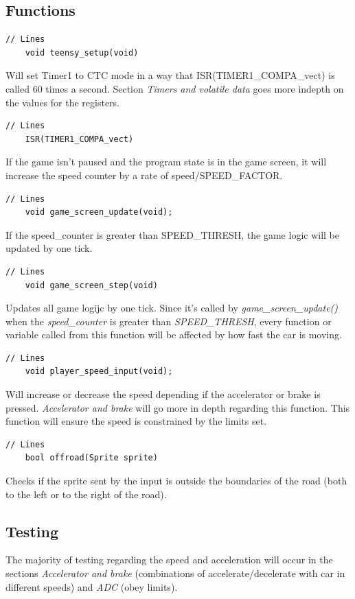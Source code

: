 \documentclass{article}
\begin{document}
\subsection*{Functions}
\begin{lstlisting}[style=CStyle]
	// Lines
	void teensy_setup(void)
\end{lstlisting}
Will set Timer1 to CTC mode in a way that ISR(TIMER1\_COMPA\_vect) is called 60 times a second. Section \emph{Timers and volatile data} goes more indepth on the values for the registers. 
\begin{lstlisting}[style=CStyle]
	// Lines
	ISR(TIMER1_COMPA_vect)
\end{lstlisting}
If the game isn't paused and the program state is in the game screen, it will increase the speed counter by a rate of speed/SPEED\_FACTOR.
\begin{lstlisting}[style=CStyle]
	// Lines
	void game_screen_update(void);
\end{lstlisting}
If the speed\_counter is greater than SPEED\_THRESH, the game logic will be updated by one tick. 
\newpage
\begin{lstlisting}[style=CStyle]
	// Lines
	void game_screen_step(void)
\end{lstlisting}
Updates all game logijc by one tick. Since it's called by \emph{game\_screen\_update()} when the \emph{speed\_counter} is greater than \emph{SPEED\_THRESH}, every function or variable called from this function will be affected by how fast the car is moving.
\begin{lstlisting}[style=CStyle]
	// Lines
	void player_speed_input(void);
\end{lstlisting}
Will increase or decrease the speed depending if the accelerator or brake is pressed. \emph{Accelerator and brake} will go more in depth regarding this function. This function will ensure the speed is constrained by the limits set.
\begin{lstlisting}[style=CStyle]
	// Lines
	bool offroad(Sprite sprite)
\end{lstlisting}
Checks if the sprite sent by the input is outside the boundaries of the road (both to the left or to the right of the road).
\newline

\subsection*{Testing}
The majority of testing regarding the speed and acceleration will occur in the sections \emph{Accelerator and brake} (combinations of accelerate/decelerate with car in different speeds) and \emph{ADC} (obey limits). 
\end{document}
